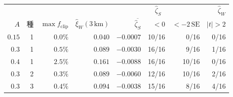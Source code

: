 \begin{tabular}{rrrrrrrr}
\toprule
& & & & \multicolumn{3}{c}{$\hat\zeta_S$} & $\hat\zeta_W$ \\
$A$ & 種 & $\max f_{\mathrm{clip}}$ & $\hat\xi_W(3\,\mathrm{km})$ & $\overline{\hat\zeta_S}$ & $< 0$ & $< -2\,\mathrm{SE}$ & $|t| > 2$ \\
\midrule
$0.15$ & 1 & $0.0\%$ & $0.040$ & $-0.0007$ & 10/16 & 0/16 & 0/16 \\
$0.3$ & 1 & $0.5\%$ & $0.089$ & $-0.0030$ & 16/16 & 9/16 & 1/16 \\
$0.4$ & 1 & $2.5\%$ & $0.161$ & $-0.0088$ & 16/16 & 10/16 & 0/16 \\
$0.3$ & 2 & $0.3\%$ & $0.089$ & $-0.0060$ & 12/16 & 10/16 & 2/16 \\
$0.3$ & 3 & $0.4\%$ & $0.094$ & $-0.0038$ & 15/16 & 8/16 & 4/16 \\
\bottomrule
\end{tabular}
